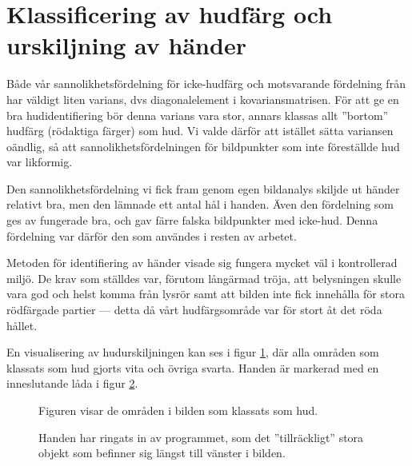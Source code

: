 \documentclass[../rapport_MVEX01-11-05]{subfiles}
\begin{document}
\section{Klassificering av hudfärg och urskiljning av händer}
Både vår sannolikhetsfördelning för icke-hudfärg och motsvarande
fördelning från  har väldigt liten varians,
dvs diagonalelement i kovariansmatrisen. För att ge en bra
hudidentifiering bör denna varians vara stor, annars klassas allt
''bortom'' hudfärg (rödaktiga färger) som hud. Vi valde därför att
istället sätta variansen oändlig, så att sannolikhetsfördelningen för
bildpunkter som inte föreställde hud var likformig.

Den sannolikhetsfördelning vi fick fram genom egen bildanalys skiljde
ut händer relativt bra, men den lämnade ett antal hål i handen. Även
den fördelning som ges av  fungerade bra, och
gav färre falska bildpunkter med icke-hud. Denna fördelning var därför den som
användes i resten av arbetet. 

Metoden för identifiering av händer visade sig fungera mycket väl i
kontrollerad miljö. De krav som ställdes var, förutom långärmad
tröja, att belysningen skulle vara god och helst komma från lysrör
samt att bilden inte fick innehålla för stora rödfärgade partier --- detta
då vårt hudfärgsområde var för stort åt det röda hållet. 

En visualisering av hudurskiljningen kan ses i figur
\ref{fig:hudklassificering}, där alla områden som klassats som hud
gjorts vita och övriga svarta. Handen är markerad med en inneslutande
låda i figur \ref{fig:boundingbox}.

\begin{figure}
  \centering
  \caption{Figuren visar de områden i bilden som klassats som hud.}
  \label{fig:hudklassificering}
\end{figure}

\begin{figure}
  \centering
  \caption{Handen har ringats in av programmet, som det
  ''tillräckligt'' stora objekt som befinner sig
  längst till vänster i bilden.}
  \label{fig:boundingbox}
\end{figure}
\end{document}

